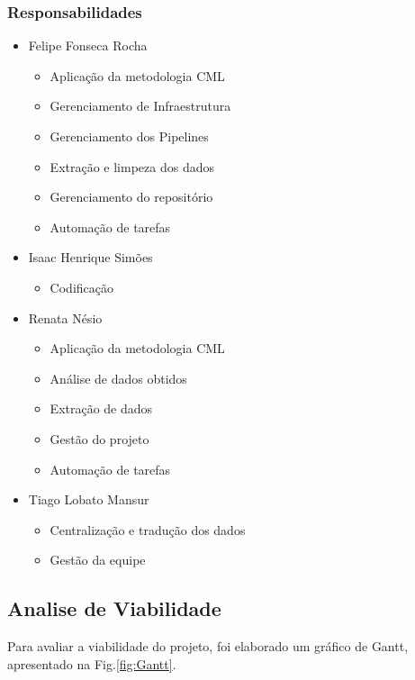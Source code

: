 \documentclass[journal]{IEEEtran}
\begin{document}
\subsubsection{Responsabilidades}
\begin{itemize}
   \item Felipe Fonseca Rocha
   \begin{itemize}
     \item Aplicação da metodologia CML
     \item Gerenciamento de Infraestrutura
     \item Gerenciamento dos Pipelines
     \item Extração e limpeza dos dados
     \item Gerenciamento do repositório
     \item Automação de tarefas 
   \end{itemize}
   
   \item Isaac Henrique Simões
   \begin{itemize}
       \item Codificação
   \end{itemize}
   
    \item Renata Nésio
   \begin{itemize}
     \item Aplicação da metodologia CML
    \item Análise de dados obtidos
     \item Extração de dados
     \item Gestão do projeto
     \item Automação de tarefas 

   \end{itemize}
   
   \item Tiago Lobato Mansur
   \begin{itemize}
     \item Centralização e tradução dos dados
     \item Gestão da equipe
   \end{itemize}
\end{itemize}
\subsection{Analise de Viabilidade}

Para avaliar a viabilidade do projeto, foi elaborado um gráfico de Gantt, apresentado na Fig.\ref{fig:Gantt}.
\end{document}
